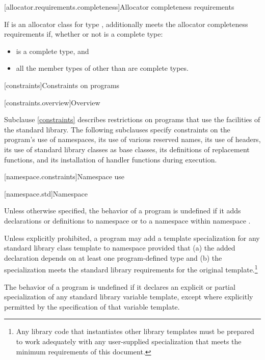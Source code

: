 [allocator.requirements.completeness]{Allocator completeness requirements}

\pnum
If  is an allocator class for type ,
 additionally meets the allocator completeness requirements if,
whether or not  is a complete type:
\begin{itemize}
\item {} is a complete type, and
\item all the member types of 
  other than  are complete types.
\end{itemize}

[constraints]{Constraints on programs}

[constraints.overview]{Overview}

\pnum
Subclause \ref{constraints} describes restrictions on \Cpp{} programs that use the facilities of
the \Cpp{} standard library. The following subclauses specify constraints on the
program's use of namespaces, its use of various reserved
names, its use of headers, its use of
standard library classes as base classes, its
definitions of replacement functions, and its
installation of handler functions during execution.

[namespace.constraints]{Namespace use}

[namespace.std]{Namespace }

\pnum
Unless otherwise specified,
the behavior of a \Cpp{} program is undefined if it adds declarations or definitions to namespace
or to a namespace within namespace
.

\pnum
Unless explicitly prohibited,
a program may add a template specialization for
any standard library class template
to namespace
 provided that
(a) the added declaration
depends on at least one program-defined type
and
(b) the specialization meets the standard library requirements
for the original template.\footnote{Any
library code that instantiates other library templates
must be prepared to work adequately with any user-supplied specialization
that meets the minimum requirements of this document.}

\pnum
The behavior of a \Cpp{} program is undefined
if it declares an explicit or partial specialization
of any standard library variable template,
except where explicitly permitted by the specification of that variable template.

